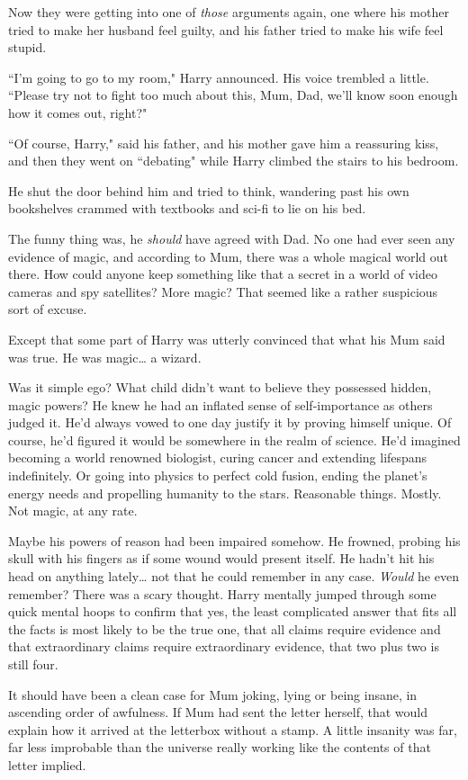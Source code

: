 Now they were getting into one of \emph{those} arguments again,
one where his mother tried to make her husband feel
guilty, and his father tried to make his wife feel stupid.

``I'm going to go to my room," Harry announced. His voice
trembled a little. ``Please try not to fight too much about
this, Mum, Dad, we'll know soon enough how it comes out, right?"

``Of course, Harry," said his father, and his mother gave
him a reassuring kiss, and then they went on ``debating"
while Harry climbed the stairs to his bedroom.

He shut the door behind him and tried to think, wandering
past his own bookshelves crammed with textbooks and
sci-fi to lie on his bed.

The funny thing was, he \emph{should} have agreed with Dad. No
one had ever seen any evidence of magic, and according
to Mum, there was a whole magical world out there. How
could anyone keep something like that a secret in a world
of video cameras and spy satellites? More magic? That
seemed like a rather suspicious sort of excuse.

Except that some part of Harry was utterly convinced that
what his Mum said was true. He was magic{\ldots} a wizard.

Was it simple ego? What child didn't want to believe they
possessed hidden, magic powers? He knew he had an
inflated sense of self-importance as others judged it. He'd
always vowed to one day justify it by proving himself
unique. Of course, he'd figured it would be somewhere in
the realm of science. He'd imagined becoming a world
renowned biologist, curing cancer and extending lifespans
indefinitely. Or going into physics to perfect cold fusion,
ending the planet's energy needs and propelling humanity
to the stars. Reasonable things. Mostly. Not magic, at any
rate.

Maybe his powers of reason had been impaired somehow.
He frowned, probing his skull with his fingers as if some
wound would present itself. He hadn't hit his head on
anything lately{\ldots} not that he could remember in any case.
\emph{Would} he even remember? There was a scary thought.
Harry mentally jumped through some quick mental hoops
to confirm that yes, the least complicated answer that fits all
the facts is most likely to be the true one, that all claims
require evidence and that extraordinary claims require
extraordinary evidence, that two plus two is still four.

It should have been a clean case for Mum joking, lying or
being insane, in ascending order of awfulness. If Mum had
sent the letter herself, that would explain how it arrived at
the letterbox without a stamp. A little insanity was far, far
less improbable than the universe really working like the
contents of that letter implied.

